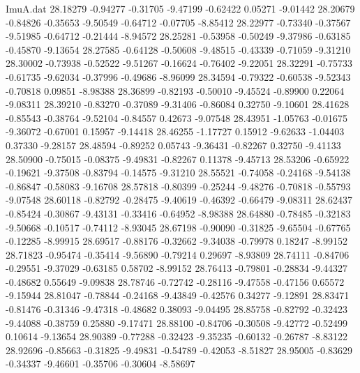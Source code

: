 \begin{filecontents}{ImuA.dat}
  28.18279   -0.94277   -0.31705   -9.47199   -0.62422    0.05271   -9.01442
  28.20679   -0.84826   -0.35653   -9.50549   -0.64712   -0.07705   -8.85412
  28.22977   -0.73340   -0.37567   -9.51985   -0.64712   -0.21444   -8.94572
  28.25281   -0.53958   -0.50249   -9.37986   -0.63185   -0.45870   -9.13654
  28.27585   -0.64128   -0.50608   -9.48515   -0.43339   -0.71059   -9.31210
  28.30002   -0.73938   -0.52522   -9.51267   -0.16624   -0.76402   -9.22051
  28.32291   -0.75733   -0.61735   -9.62034   -0.37996   -0.49686   -8.96099
  28.34594   -0.79322   -0.60538   -9.52343   -0.70818    0.09851   -8.98388
  28.36899   -0.82193   -0.50010   -9.45524   -0.89900    0.22064   -9.08311
  28.39210   -0.83270   -0.37089   -9.31406   -0.86084    0.32750   -9.10601
  28.41628   -0.85543   -0.38764   -9.52104   -0.84557    0.42673   -9.07548
  28.43951   -1.05763   -0.01675   -9.36072   -0.67001    0.15957   -9.14418
  28.46255   -1.17727    0.15912   -9.62633   -1.04403    0.37330   -9.28157
  28.48594   -0.89252    0.05743   -9.36431   -0.82267    0.32750   -9.41133
  28.50900   -0.75015   -0.08375   -9.49831   -0.82267    0.11378   -9.45713
  28.53206   -0.65922   -0.19621   -9.37508   -0.83794   -0.14575   -9.31210
  28.55521   -0.74058   -0.24168   -9.54138   -0.86847   -0.58083   -9.16708
  28.57818   -0.80399   -0.25244   -9.48276   -0.70818   -0.55793   -9.07548
  28.60118   -0.82792   -0.28475   -9.40619   -0.46392   -0.66479   -9.08311
  28.62437   -0.85424   -0.30867   -9.43131   -0.33416   -0.64952   -8.98388
  28.64880   -0.78485   -0.32183   -9.50668   -0.10517   -0.74112   -8.93045
  28.67198   -0.90090   -0.31825   -9.65504   -0.67765   -0.12285   -8.99915
  28.69517   -0.88176   -0.32662   -9.34038   -0.79978    0.18247   -8.99152
  28.71823   -0.95474   -0.35414   -9.56890   -0.79214    0.29697   -8.93809
  28.74111   -0.84706   -0.29551   -9.37029   -0.63185    0.58702   -8.99152
  28.76413   -0.79801   -0.28834   -9.44327   -0.48682    0.55649   -9.09838
  28.78746   -0.72742   -0.28116   -9.47558   -0.47156    0.65572   -9.15944
  28.81047   -0.78844   -0.24168   -9.43849   -0.42576    0.34277   -9.12891
  28.83471   -0.81476   -0.31346   -9.47318   -0.48682    0.38093   -9.04495
  28.85758   -0.82792   -0.32423   -9.44088   -0.38759    0.25880   -9.17471
  28.88100   -0.84706   -0.30508   -9.42772   -0.52499    0.10614   -9.13654
  28.90389   -0.77288   -0.32423   -9.35235   -0.60132   -0.26787   -8.83122
  28.92696   -0.85663   -0.31825   -9.49831   -0.54789   -0.42053   -8.51827
  28.95005   -0.83629   -0.34337   -9.46601   -0.35706   -0.30604   -8.58697

\end{filecontents}
